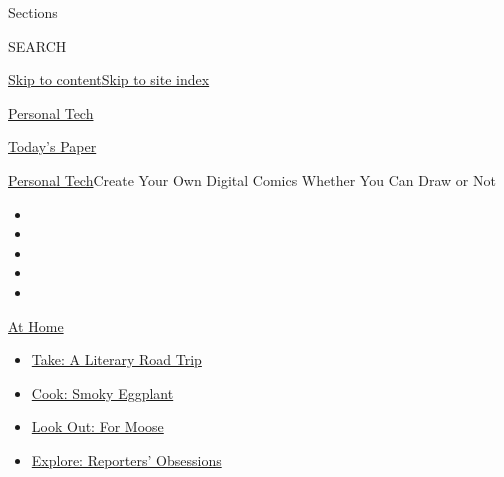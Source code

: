 Sections

SEARCH

\protect\hyperlink{site-content}{Skip to
content}\protect\hyperlink{site-index}{Skip to site index}

\href{https://www.nytimes3xbfgragh.onion/section/technology/personaltech}{Personal
Tech}

\href{https://myaccount.nytimes3xbfgragh.onion/auth/login?response_type=cookie\&client_id=vi}{}

\href{https://www.nytimes3xbfgragh.onion/section/todayspaper}{Today's
Paper}

\href{/section/technology/personaltech}{Personal Tech}\textbar{}Create
Your Own Digital Comics Whether You Can Draw or Not

\begin{itemize}
\item
\item
\item
\item
\item
\end{itemize}

\href{https://www.nytimes3xbfgragh.onion/spotlight/at-home?action=click\&pgtype=Article\&state=default\&region=TOP_BANNER\&context=at_home_menu}{At
Home}

\begin{itemize}
\tightlist
\item
  \href{https://www.nytimes3xbfgragh.onion/2020/07/28/books/time-for-a-literary-road-trip.html?action=click\&pgtype=Article\&state=default\&region=TOP_BANNER\&context=at_home_menu}{Take:
  A Literary Road Trip}
\item
  \href{https://www.nytimes3xbfgragh.onion/2020/07/29/magazine/bored-with-your-home-cooking-some-smoky-eggplant-will-fix-that.html?action=click\&pgtype=Article\&state=default\&region=TOP_BANNER\&context=at_home_menu}{Cook:
  Smoky Eggplant}
\item
  \href{https://www.nytimes3xbfgragh.onion/2020/07/27/travel/moose-michigan-isle-royale.html?action=click\&pgtype=Article\&state=default\&region=TOP_BANNER\&context=at_home_menu}{Look
  Out: For Moose}
\item
  \href{https://www.nytimes3xbfgragh.onion/interactive/2020/at-home/even-more-reporters-editors-diaries-lists-recommendations.html?action=click\&pgtype=Article\&state=default\&region=TOP_BANNER\&context=at_home_menu}{Explore:
  Reporters' Obsessions}
\end{itemize}

